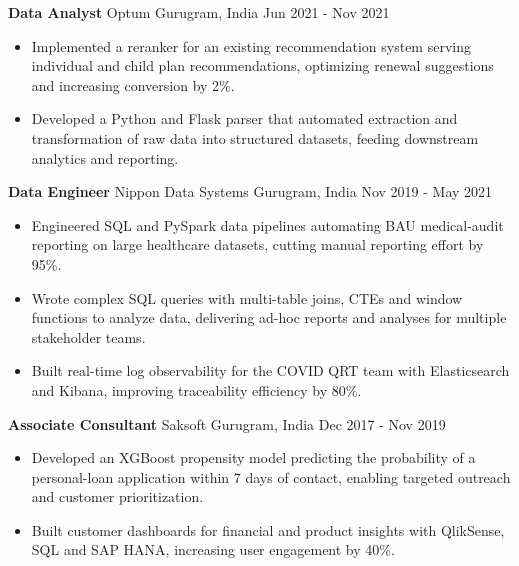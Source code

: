 \documentclass[10pt,a4paper]{article}
\newcommand{\role}[4]{\textbf{#1} \textbar{} #2 \hfill #3 \textbar{} #4\par}
\begin{document}
\vspace{3pt}
\role{Data Analyst}{Optum}{Gurugram, India}{Jun 2021 - Nov 2021}
\begin{itemize}
  \item Implemented a reranker for an existing recommendation system serving individual and child plan recommendations, optimizing renewal suggestions and increasing conversion by 2\%.
  \item Developed a Python and Flask parser that automated extraction and transformation of raw data into structured datasets, feeding downstream analytics and reporting.
\end{itemize}
\vspace{3pt}
\role{Data Engineer}{Nippon Data Systems}{Gurugram, India}{Nov 2019 - May 2021}
\begin{itemize}
  \item Engineered SQL and PySpark data pipelines automating BAU medical-audit reporting on large healthcare datasets, cutting manual reporting effort by 95\%.
  \item Wrote complex SQL queries with multi-table joins, CTEs and window functions to analyze data, delivering ad-hoc reports and analyses for multiple stakeholder teams.
  \item Built real-time log observability for the COVID QRT team with Elasticsearch and Kibana, improving traceability efficiency by 80\%.
\end{itemize}
\vspace{3pt}
\role{Associate Consultant}{Saksoft}{Gurugram, India}{Dec 2017 - Nov 2019}
\begin{itemize}
  \item Developed an XGBoost propensity model predicting the probability of a personal-loan application within 7 days of contact, enabling targeted outreach and customer prioritization.
  \item Built customer dashboards for financial and product insights with QlikSense, SQL and SAP HANA, increasing user engagement by 40\%.
\end{itemize}
\end{document}
